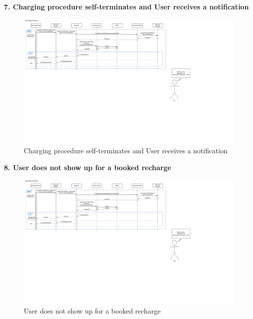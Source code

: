 \documentclass[11pt]{article}
\begin{document}
\begin{description}
    \item \textbf{7. Charging procedure self-terminates and User receives a notification}
    \begin{figure}[!ht]
        \centering
        \includegraphics[page={7}, trim=0cm 16cm 0cm 1cmm, width=\linewidth, clip]{RuntimeDiagrams.pdf}
        \caption{Charging procedure self-terminates and User receives a notification}
    \end{figure}
    
    \item \textbf{8. User does not show up for a booked recharge}
    \begin{figure}[!ht]
        \centering
        \includegraphics[page={8}, trim=0cm 19cm 26cm 1cmm, width=0.8\linewidth, clip]{RuntimeDiagrams.pdf}
        \caption{User does not show up for a booked recharge}
    \end{figure}
    

\end{description}
\end{document}
